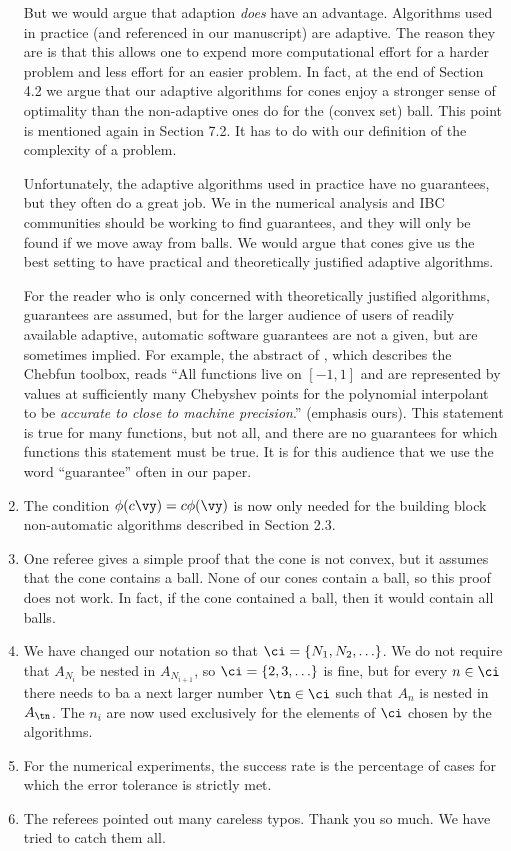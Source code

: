 \documentclass[11pt]{article}
\begin{document}
\begin{enumerate}
But we would argue that adaption \emph{does} have an advantage.  Algorithms used in practice (and referenced in our manuscript) are adaptive.  The reason they are is that this allows one to expend more computational effort for a harder problem and less effort for an easier problem.  In fact, at the end of Section 4.2 we argue that our adaptive algorithms for cones enjoy a stronger sense of optimality than the non-adaptive ones do for the (convex set) ball. This point is mentioned again in Section 7.2.  It has to do with our definition of the complexity of a problem. 

Unfortunately, the adaptive algorithms used in practice have no guarantees, but they often do a great job.  We in the numerical analysis and IBC communities should be working to find guarantees, and they will only be found if we move away from balls.  We would argue that cones give us the best setting to have practical and theoretically justified adaptive algorithms.  

For the reader who is only concerned with theoretically justified algorithms, guarantees are assumed, but for the larger audience of users of readily available adaptive, automatic software guarantees are not a given, but are sometimes implied.  For example, the abstract of \cite{BatTre04a}, which describes the Chebfun toolbox, reads ``All functions live on $[-1,1]$ and are represented by values at sufficiently many Chebyshev points for the polynomial interpolant to be \emph{accurate to close to machine precision}.''  (emphasis ours).  This statement is true for many functions, but not all, and there are no guarantees for which functions this statement must be true.  It is for this audience that we use the word ``guarantee'' often in our paper.

\item The condition $\phi(c\vy) = c\phi(\vy)$ is now only needed for the building block non-automatic algorithms described in Section 2.3.

\item One referee gives a simple proof that the cone is not convex, but it assumes that the cone contains a ball.  None of our cones contain a ball, so this proof does not work.  In fact, if the cone contained a ball, then it would contain all balls.

\item We have changed our notation so that $\ci=\{N_1, N_2, \ldots \}$.  We do not require that $A_{N_i}$ be nested in $A_{N_{i+1}}$, so $\ci=\{2,3, \ldots\}$ is fine, but for every $n \in \ci$ there needs to ba a next larger number $\tn \in \ci$ such that $A_n$ is nested in $A_{\tn}$.  The $n_i$ are now used exclusively for the elements of $\ci$ chosen by the algorithms.

\item For the numerical experiments, the success rate is the percentage of cases for which the error tolerance is strictly met.  

\item The referees pointed out many careless typos.  Thank you so much.  We have tried to catch them all.

\end{enumerate}
\end{document}
